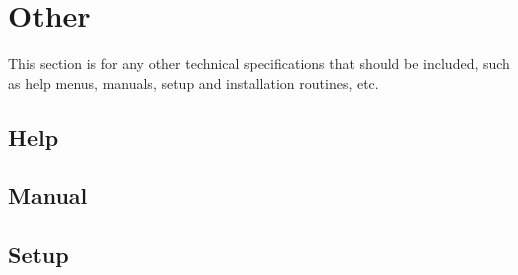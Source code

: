 \section{Other} %
This section is for any other technical specifications that should be included, such as help menus, manuals, setup and installation routines, etc.
\subsection{Help} %

\subsection{Manual} %

\subsection{Setup} %
